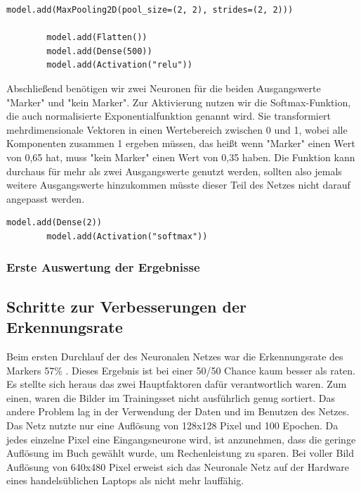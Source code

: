 \documentclass[conference]{IEEEtran}
\begin{document}
	\begin{lstlisting}[label={list:model_1_3},caption=Modell: vierte und fünfte Schicht]
		model.add(MaxPooling2D(pool_size=(2, 2), strides=(2, 2)))

		model.add(Flatten())
		model.add(Dense(500))
		model.add(Activation("relu"))
	\end{lstlisting}

	Abschließend benötigen wir zwei Neuronen für die beiden Ausgangswerte "Marker" und "kein Marker".
	Zur Aktivierung nutzen wir die Softmax-Funktion, die auch normalisierte Exponentialfunktion genannt wird.
	Sie transformiert mehrdimensionale Vektoren in einen Wertebereich zwischen 0 und 1, wobei alle Komponenten zusammen 1 ergeben müssen, das heißt wenn "Marker" einen Wert von 0,65 hat, muss "kein Marker" einen Wert von 0,35 haben. 
	Die Funktion kann durchaus für mehr als zwei Ausgangswerte genutzt werden, sollten also jemals weitere Ausgangswerte hinzukommen müsste dieser Teil des Netzes nicht darauf angepasst werden. 

	\begin{lstlisting}[label={list:model_1_4},caption=Modell: finale sechste Schicht]
		model.add(Dense(2))
		model.add(Activation("softmax"))
	\end{lstlisting}

	\subsubsection{Erste Auswertung der Ergebnisse}	%
	\subsection{Schritte zur Verbesserungen der Erkennungsrate} %
	Beim ersten Durchlauf der des Neuronalen Netzes war die Erkennungsrate des Markers 57\% . Dieses Ergebnis ist bei einer 50/50 Chance kaum besser als raten. Es stellte sich heraus das zwei Hauptfaktoren dafür verantwortlich waren. Zum einen, waren die Bilder im Trainingsset nicht ausführlich genug sortiert. Das andere Problem lag in der Verwendung der Daten und im Benutzen des Netzes.  Das Netz nutzte nur eine Auflösung von 128x128 Pixel und 100 Epochen. Da jedes einzelne Pixel eine Eingangsneurone wird, ist anzunehmen,  dass die geringe Auflösung im Buch gewählt wurde, um Rechenleistung zu sparen. Bei voller Bild Auflösung von 640x480 Pixel erweist sich das Neuronale Netz auf der Hardware eines handelsüblichen Laptops als nicht mehr lauffähig. 
	
\end{document}
